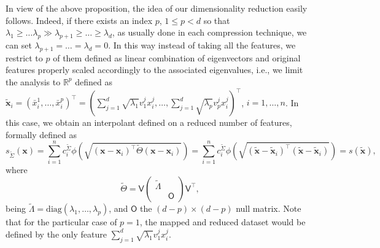 \documentclass[hyphens,a4paper,11pt]{article}
\newcommand{\mO}{\mathsf{O}}
\newcommand{\mV}{\mathsf{V}}
\newcommand{\mTheta}{\mathsf{\Theta}}
\newcommand{\mSigma}{\mathsf{\Sigma}}
\newcommand{\mLambda}{\mathsf{\Lambda}}
\begin{document}
In view of the above proposition, the idea of our dimensionality reduction easily follows. Indeed, if there exists an index $p$, $1\leq p < d$ so that $\lambda_{1} \geq \ldots \lambda_{p} \gg \lambda_{p+1} \geq \ldots \geq \lambda_{d}$, as usually done in each compression technique, we can set $\lambda_{p+1} = \ldots = \lambda_{d}=0$. In this way instead of taking all the features, we restrict to $p$ of them defined as linear combination of eigenvectors and original features properly scaled accordingly to the associated eigenvalues, i.e., we limit the analysis to $\mathbb{R}^p$ defined as $\tilde{\boldsymbol{x}}_i = ({\bar{x}}_{i}^1, \ldots, {\bar{x}}_{i}^p)^{\intercal} = \left( \sum_{j=1}^d \sqrt{\lambda_1}v_1^j{{x}}_{i}^j, \ldots, \sum_{j=1}^d \sqrt{\lambda_p}v_p^j{{x}}_{i}^j\right)^{\intercal}$, $i=1,\ldots,n$. In this case, we obtain an interpolant defined on a reduced number of features, formally defined as
$$
s_{\tilde{\mSigma}} (\boldsymbol{x}) = \sum_{i=1}^n c_i^{\tilde{\mSigma}}  \phi \left( \sqrt{(\boldsymbol{x}-\boldsymbol{x}_i)^{\intercal} \tilde{\mTheta} (\boldsymbol{x}-\boldsymbol{x}_i)}\right) = \sum_{i=1}^n c_i^{\tilde{\mSigma}}  \phi \left( \sqrt{(\tilde{\boldsymbol{x}}-\tilde{\boldsymbol{x}}_i)^{\intercal} (\tilde{\boldsymbol{x}}-\tilde{\boldsymbol{x}}_i)} \right) = s(\tilde{\boldsymbol{x}}), 
$$
where
$$
\tilde{\mTheta} =  \mV \begin{pmatrix}
\tilde{\mLambda} &  \\
 & \mO
\end{pmatrix}
{\mV}^{\intercal}, 
$$
being $\tilde{\mLambda} = \textrm{diag}(\lambda_1,\ldots,\lambda_p)$, and $\mO $ the ${(d-p) \times (d-p)}$ null matrix. Note that for the particular case of $p=1$, the mapped and reduced dataset would be defined by the only feature $\sum_{j=1}^d \sqrt{\lambda_1}v_1^j{{x}}_{i}^j$.

\end{document}

